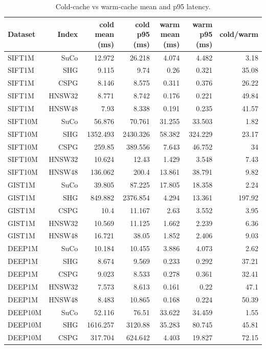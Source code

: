 \begin{table}[t]
\centering
\small
\caption{Cold-cache vs warm-cache mean and p95 latency.}
\label{tab:cold-warm}
\begin{tabular}{lrrrrrr}
\toprule
Dataset & Index & cold mean (ms) & cold p95 (ms) & warm mean (ms) & warm p95 (ms) & cold/warm \\
\midrule
SIFT1M & SuCo & 12.972 & 26.218 & 4.074 & 4.482 & 3.18 \\
SIFT1M & SHG & 9.115 & 9.74 & 0.26 & 0.321 & 35.08 \\
SIFT1M & CSPG & 8.146 & 8.575 & 0.311 & 0.376 & 26.22 \\
SIFT1M & HNSW32 & 8.771 & 8.742 & 0.176 & 0.221 & 49.84 \\
SIFT1M & HNSW48 & 7.93 & 8.338 & 0.191 & 0.235 & 41.57 \\
SIFT10M & SuCo & 56.876 & 70.761 & 31.255 & 33.503 & 1.82 \\
SIFT10M & SHG & 1352.493 & 2430.326 & 58.382 & 324.229 & 23.17 \\
SIFT10M & CSPG & 259.85 & 389.556 & 7.643 & 46.752 & 34 \\
SIFT10M & HNSW32 & 10.624 & 12.43 & 1.429 & 3.548 & 7.43 \\
SIFT10M & HNSW48 & 136.062 & 200.4 & 13.861 & 38.791 & 9.82 \\
GIST1M & SuCo & 39.805 & 87.225 & 17.805 & 18.358 & 2.24 \\
GIST1M & SHG & 849.882 & 2376.854 & 4.294 & 13.361 & 197.92 \\
GIST1M & CSPG & 10.4 & 11.167 & 2.63 & 3.552 & 3.95 \\
GIST1M & HNSW32 & 10.569 & 11.125 & 1.662 & 2.239 & 6.36 \\
GIST1M & HNSW48 & 16.721 & 38.05 & 1.852 & 2.406 & 9.03 \\
DEEP1M & SuCo & 10.184 & 10.455 & 3.886 & 4.073 & 2.62 \\
DEEP1M & SHG & 8.674 & 9.569 & 0.233 & 0.292 & 37.21 \\
DEEP1M & CSPG & 9.023 & 8.533 & 0.278 & 0.361 & 32.41 \\
DEEP1M & HNSW32 & 7.573 & 8.613 & 0.161 & 0.22 & 47.1 \\
DEEP1M & HNSW48 & 8.483 & 10.865 & 0.168 & 0.224 & 50.39 \\
DEEP10M & SuCo & 52.116 & 76.51 & 33.622 & 34.459 & 1.55 \\
DEEP10M & SHG & 1616.257 & 3120.88 & 35.283 & 80.745 & 45.81 \\
DEEP10M & CSPG & 317.704 & 624.642 & 4.403 & 19.827 & 72.15 \\

\end{tabular}
\end{table}
